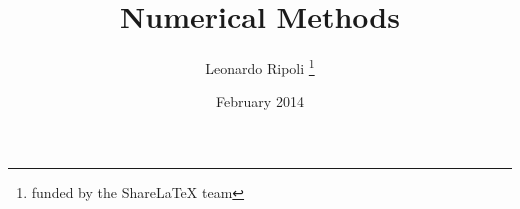 \documentclass[12pt,mythesisstyle]{article}
\begin{document}
%


\onehalfspacing


\title{Numerical Methods}
\author{Leonardo Ripoli \thanks{funded by the ShareLaTeX team}}
\date{February 2014}











\end{document}
